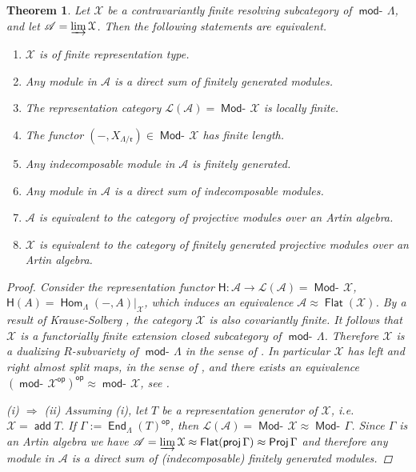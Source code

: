 \documentclass[oneside, a4paper,reqno]{amsart}
\numberwithin{equation}{section}
\newtheorem{thm}{Theorem}[section]
\theoremstyle{definition}
\begin{document}
\begin{thm} Let ${\mathcal X}$ be a contravariantly finite resolving
subcategory of $\operatorname*{\mathsf{mod}-\!}\Lambda$, and let ${\mathscr A} = \operatorname*{\varinjlim}{\mathcal X}$. Then the
following statements are equivalent.
\begin{enumerate}
\item $\mathcal X$ is of finite representation type.
\item Any module in ${\mathscr A}$ is a direct sum of  finitely generated
modules.
\item The representation category $\mathcal L({\mathscr A}) = \operatorname*{\mathsf{Mod}-\!}{\mathcal X}$ is locally finite.
\item The functor $(-,X_{\Lambda/\mathfrak{r}}) \in \operatorname*{\mathsf{Mod}-\!}{\mathcal X}$ has finite length.
\item Any indecomposable module in ${\mathscr A}$ is finitely generated.
\item Any module in ${\mathscr A}$ is a direct sum of indecomposable
modules.
\item ${\mathscr A}$ is equivalent to the category of projective modules over
an Artin algebra.
\item ${\mathcal X}$ is equivalent to the category of finitely generated projective modules over
an Artin algebra.
\end{enumerate}
\begin{proof} Consider  the representation functor $\mathsf{H} \colon {\mathscr A} {\longrightarrow}
\mathcal L({\mathscr A}) = \operatorname*{\mathsf{Mod}-\!}{\mathcal X}$, $\mathsf{H}(A) =
\operatorname{\mathsf{Hom}}_{\Lambda}(-,A)|_{\mathcal X}$, which induces an equivalence ${\mathscr A} \approx
\operatorname*{\mathsf{Flat}}({\mathcal X})$. By a result of Krause-Solberg \cite{KS:appl}, the
category ${\mathcal X}$ is also covariantly finite. It follows that ${\mathcal X}$ is a
functorially finite extension closed subcategory of $\operatorname*{\mathsf{mod}-\!}\Lambda$.
Therefore ${\mathcal X}$ is a dualizing $R$-subvariety of $\operatorname*{\mathsf{mod}-\!}\Lambda$ in
the sense of \cite{AS:subcategories}. In particular ${\mathcal X}$ has left
and right almost split maps, in the sense of
\cite{AS:subcategories}, and there exists an equivalence
$(\operatorname*{\mathsf{mod}-\!}{\mathcal X}^\operatorname*{\mathsf{op}})^\operatorname*{\mathsf{op}} \approx \operatorname*{\mathsf{mod}-\!}{\mathcal X}$, see \cite{AR:dual}.

(i) $\Rightarrow$ (ii) Assuming (i), let $T$ be a representation
generator of ${\mathcal X}$, i.e. ${\mathcal X} = \operatorname*{\mathsf{add}} T$. If $\Gamma :=
\operatorname*{\mathsf{End}}_{\Lambda}(T)^\operatorname*{\mathsf{op}}$, then $\mathcal L({\mathscr A}) = \operatorname*{\mathsf{Mod}-\!}{\mathcal X} \approx
\operatorname*{\mathsf{Mod}-\!}\Gamma$. Since $\Gamma$ is an Artin algebra we have ${\mathscr A} =
\operatorname*{\varinjlim}{\mathcal X} \approx \operatorname*{\mathsf{Flat}}(\operatorname*{\mathsf{proj}}\Gamma) \approx \operatorname*{\mathsf{Proj}}\Gamma$ and
therefore any module in ${\mathscr A}$ is a direct sum of (indecomposable)
finitely generated modules.


\end{proof}
\end{thm}
\end{document}
